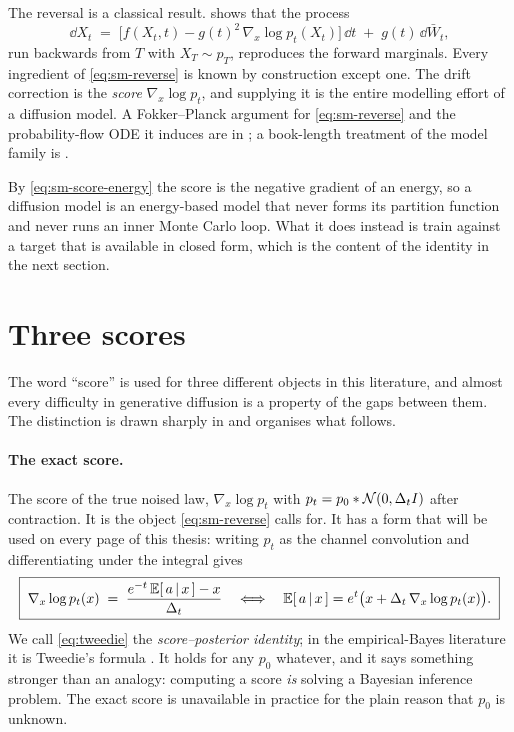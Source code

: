 The reversal is a classical result. \citet{anderson1982reverse} shows that the
process
\begin{equation}
  \dd X_t \;=\;
  \Big[ f(X_t, t) - g(t)^2\, \nabla_x \log p_t(X_t) \Big]\,\dd t
  \;+\; g(t)\,\dd \bar{W}_t ,
  \label{eq:sm-reverse}
\end{equation}
run backwards from $T$ with $X_T \sim p_T$, reproduces the forward marginals.
Every ingredient of \eqref{eq:sm-reverse} is known by construction except one.
The drift correction is the \emph{score} $\nabla_x \log p_t$, and supplying it
is the entire modelling effort of a diffusion model. A Fokker--Planck argument
for \eqref{eq:sm-reverse} and the probability-flow ODE it induces are in
\compendium{}; a book-length treatment of the model family is
\citet{lai2025principles}.

By \eqref{eq:sm-score-energy} the score is the negative gradient of an energy,
so a diffusion model is an energy-based model that never forms its partition
function and never runs an inner Monte Carlo loop. What it does instead is
train against a target that is available in closed form, which is the content
of the identity in the next section.

\section{Three scores}
\label{sec:sm-three-scores}\label{sec:tweedie}

The word ``score'' is used for three different objects in this literature, and
almost every difficulty in generative diffusion is a property of the gaps
between them. The distinction is drawn sharply in \citet{biroli2023generative}
and organises what follows.

\paragraph{The exact score.} The score of the true noised law,
$\nabla_x \log p_t$ with $p_t = p_0 * \mathcal{N}(0,\Delta_t I)$ after contraction. It is
the object \eqref{eq:sm-reverse} calls for. It has a form that will be used on
every page of this thesis: writing $p_t$ as the channel convolution and
differentiating under the integral gives
\begin{equation}
  \boxed{\;
  \nabla_x \log p_t(x)
  \;=\; \frac{e^{-t}\,\mathbb{E}[\,a \,|\, x\,] - x}{\Delta_t}
  \quad\Longleftrightarrow\quad
  \mathbb{E}[\,a \,|\, x\,]
  = e^{t}\big( x + \Delta_t\, \nabla_x \log p_t(x) \big).
  \;}
  \label{eq:tweedie}
\end{equation}
We call \eqref{eq:tweedie} the \emph{score--posterior identity}; in the
empirical-Bayes literature it is Tweedie's formula
\citep{robbins1956empirical, miyasawa1961empirical, efron2011tweedie,
vincent2011connection}. It holds for any $p_0$ whatever, and it says something
stronger than an analogy: computing a score \emph{is} solving a Bayesian
inference problem. The exact score is unavailable in practice for the plain
reason that $p_0$ is unknown.

